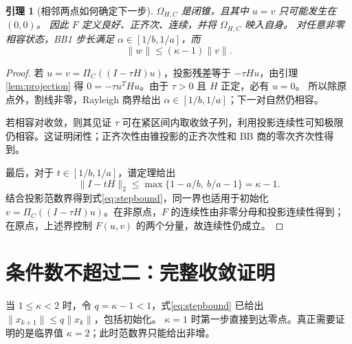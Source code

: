 \documentclass[11pt,a4paper,UTF8,fontset=fandol]{ctexart}
\newtheorem{lemma}[theorem]{引理}
\theoremstyle{remark}\newtheorem{remark}[theorem]{说明}
\newcommand{\norm}[1]{\lVert #1\rVert}
\begin{document}
\begin{lemma}[相邻两点如何确定下一步]\label{lem:well-defined}
$\Omega_{H,C}$ 是闭锥，且其中 $u=v$ 只可能发生在 $(0,0)$。
因此 $F$ 定义良好、正齐次、连续，并将 $\Omega_{H,C}$ 映入自身。
对任意非零相容状态，BB1 步长满足 $\alpha\in[1/b,1/a]$，而
\begin{equation}\label{eq:stepbound}
 \norm{w}\le(\kappa-1)\norm{v}.
\end{equation}
\end{lemma}
\begin{proof}
若 $u=v=\Pi_C((I-\tau H)u)$，投影残差等于 $-\tau Hu$，由引理\ref{lem:projection} 得
$0=-\tau u^THu$。由于 $\tau>0$ 且 $H$ 正定，必有 $u=0$。
所以除原点外，割线非零，Rayleigh 商界给出 $\alpha\in[1/b,1/a]$；下一对自然仍相容。

若相容对收敛，则其见证 $\tau$ 可在紧区间内取收敛子列，利用投影连续性可知极限仍相容。这证明闭性；正齐次性由锥投影的正齐次性和 BB 商的零次齐次性得到。

最后，对于 $t\in[1/b,1/a]$，谱定理给出
\[
 \norm{I-tH}_{2}\le
 \max\{1-a/b,\ b/a-1\}=\kappa-1.
\]
结合投影范数界得到式\eqref{eq:stepbound}，同一界也适用于初始化
$v=\Pi_C((I-\tau H)u)$。在非原点，$F$ 的连续性由非零分母和投影连续性得到；在原点，上述界控制 $F(u,v)$ 的两个分量，故连续性仍成立。
\end{proof}

\section{条件数不超过二：完整收敛证明}
当 $1\le\kappa<2$ 时，令 $q=\kappa-1<1$，式\eqref{eq:stepbound} 已给出
$\norm{x_{k+1}}\le q\norm{x_k}$，包括初始化。
$\kappa=1$ 时第一步直接到达零点。真正需要证明的是临界值 $\kappa=2$；此时范数界只能给出非增。
\end{document}
